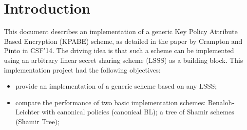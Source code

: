 \documentclass{article}
\begin{document}
\newcommand{\code}[1]{{\tt #1}\xspace}


\newcommand{\cKPABE}{\code{KPABE}}
\newcommand{\cSS}{\code{SecretSharing}}
\newcommand{\cAP}{\code{AccessPolicy}}
\newcommand{\cST}{\code{ShareTuple}}
\newcommand{\cBLcanon}{\code{BLSS}}
\newcommand{\cBLcanonAP}{\code{BLAccessPolicy}}
\newcommand{\cShTree}{\code{ShTreeSS}}
\newcommand{\cShTreeAP}{\code{ShTreeAccessPolicy}}
\newcommand{\cnode}{\code{NodeContent}}
\newcommand{\ctree}{\code{TreeNode}}
\newcommand{\cBig}{\code{Big}}
\newcommand{\cPFC}{\code{PFC}}

\newcommand{\cstring}{\code{std::string}}

\newcommand{\fmake}{\code{make}}
\newcommand{\fhkpabe}{\code{kpabe.h}}
\newcommand{\fckpabe}{\code{kpabe.cpp}}
\newcommand{\ftkpabe}{\code{testkpabe.cpp}}
\newcommand{\fhss}{\code{secretsharing.h}}
\newcommand{\fcss}{\code{secretsharing.cpp}}
\newcommand{\fhblcanon}{\code{BLcanonical.h}}
\newcommand{\fcblcanon}{\code{BLcanonical.cpp}}
\newcommand{\ftblcanon}{\code{testBLcanonical.cpp}}
\newcommand{\fhshtree}{\code{ShTree.h}}
\newcommand{\fcshtree}{\code{ShTree.cpp}}
\newcommand{\ftshtree}{\code{testShTree.cpp}}
\newcommand{\fhtree}{\code{tree.h}}
\newcommand{\fctree}{\code{tree.cpp}}
\newcommand{\fttree}{\code{testtree.cpp}}
\newcommand{\fhutils}{\code{utils.h}}
\newcommand{\fcutils}{\code{utils.cpp}}
\newcommand{\ftutils}{\code{testutils.cpp}}





\section{Introduction}

This document describes an implementation of a generic Key Policy Attribute Based Encryption (KPABE) scheme, as detailed in the paper by Crampton and Pinto in CSF'14. The driving idea is that such a scheme can be implemented using an arbitrary linear secret sharing scheme (LSSS) as a building block. This implementation project had the following objectives:
\begin{itemize}
\item provide an implementation of a generic scheme based on any LSSS;
\item compare the performance of two basic implementation schemes: Benaloh-Leichter with canonical policies (canonical BL); a tree of Shamir schemes (Shamir Tree);
\end{itemize}
\end{document}
